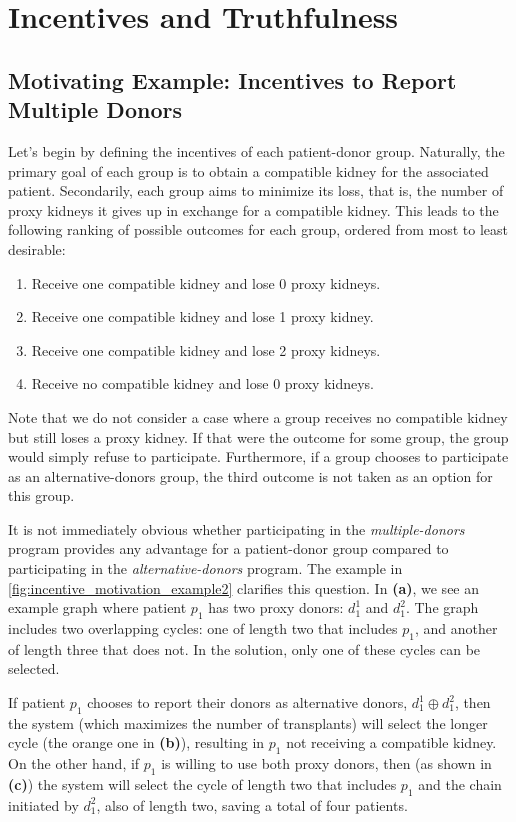 \chapter{Incentives and Truthfulness}
\label{cha:incentives_and_truthfulness}


\section{Motivating Example: Incentives to Report Multiple Donors}
\label{sec:incentives}

Let's begin by defining the incentives of each patient-donor group. Naturally, the primary goal of each group is to obtain a compatible kidney for the associated patient. Secondarily, each group aims to minimize its loss, that is, the number of proxy kidneys it gives up in exchange for a compatible kidney. This leads to the following ranking of possible outcomes for each group, ordered from most to least desirable:

\begin{enumerate}
\item Receive one compatible kidney and lose 0 proxy kidneys.
\item Receive one compatible kidney and lose 1 proxy kidney.
\item Receive one compatible kidney and lose 2 proxy kidneys.
\item Receive no compatible kidney and lose 0 proxy kidneys.
\end{enumerate}

Note that we do not consider a case where a group receives no compatible kidney but still loses a proxy kidney. If that were the outcome for some group, the group would simply refuse to participate. Furthermore, if a group chooses to participate as an alternative-donors group, the third outcome is not taken as an option for this group.

It is not immediately obvious whether participating in the \textit{multiple-donors} program provides any advantage for a patient-donor group compared to participating in the \textit{alternative-donors} program. The example in \autoref{fig:incentive_motivation_example2} clarifies this question. In \textbf{(a)}, we see an example graph where patient $p_1$ has two proxy donors: $d_1^1$ and $d_1^2$. The graph includes two overlapping cycles: one of length two that includes $p_1$, and another of length three that does not. In the solution, only one of these cycles can be selected.

If patient $p_1$ chooses to report their donors as alternative donors, $d_1^1 \oplus d_1^2$, then the system (which maximizes the number of transplants) will select the longer cycle (the orange one in \textbf{(b)}), resulting in $p_1$ not receiving a compatible kidney. On the other hand, if $p_1$ is willing to use both proxy donors, then (as shown in \textbf{(c)}) the system will select the cycle of length two that includes $p_1$ and the chain initiated by $d_1^2$, also of length two, saving a total of four patients.

